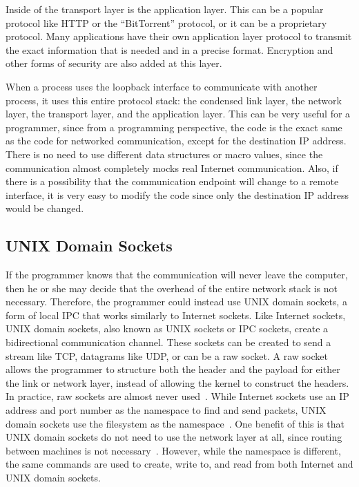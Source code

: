 Inside of the transport layer is the application layer.  This can be a popular protocol like HTTP or the ``BitTorrent'' protocol, or it can be a proprietary protocol.  Many applications have their own application layer protocol to transmit the exact information that is needed and in a precise format.  Encryption and other forms of security are also added at this layer.

When a process uses the loopback interface to communicate with another process, it uses this entire protocol stack: the condensed link layer, the network layer, the transport layer, and the application layer.  This can be very useful for a programmer, since from a programming perspective, the code is the exact same as the code for networked communication, except for the destination IP address.  There is no need to use different data structures or macro values, since the communication almost completely mocks real Internet communication.  Also, if there is a possibility that the communication endpoint will change to a remote interface, it is very easy to modify the code since only the destination IP address would be changed.

\subsection{UNIX Domain Sockets}
\label{sec:unixDomainSockets}
If the programmer knows that the communication will never leave the computer, then he or she may decide that the overhead of the entire network stack is not necessary.  Therefore, the programmer could instead use UNIX domain sockets, a form of local IPC that works similarly to Internet sockets.  Like Internet sockets, UNIX domain sockets, also known as UNIX sockets or IPC sockets, create a bidirectional communication channel.  These sockets can be created to send a stream like TCP, datagrams like UDP, or can be a raw socket.  A raw socket allows the programmer to structure both the header and the payload for either the link or network layer, instead of allowing the kernel to construct the headers.  In practice, raw sockets are almost never used~\cite[p 229--230]{Stevens:1996:TIT:233130}.  While Internet sockets use an IP address and port number as the namespace to find and send packets, UNIX domain sockets use the filesystem as the namespace~\cite[p 231]{Stevens:1996:TIT:233130}.  One benefit of this is that UNIX domain sockets do not need to use the network layer at all, since routing between machines is not necessary~\cite[p 753]{mckusick_neville-neil_watson_2015}.  However, while the namespace is different, the same commands are used to create, write to, and read from both Internet and UNIX domain sockets.

